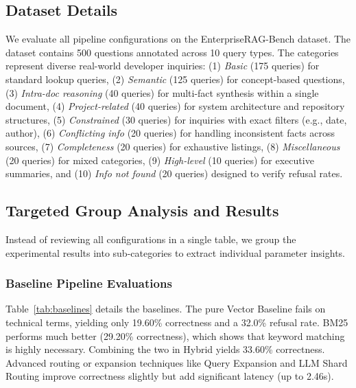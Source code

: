 \documentclass[conference]{IEEEtran}
\begin{document}
\subsection{Dataset Details}
We evaluate all pipeline configurations on the EnterpriseRAG-Bench dataset. The dataset contains 500 questions annotated across 10 query types. The categories represent diverse real-world developer inquiries: (1) \textit{Basic} (175 queries) for standard lookup queries, (2) \textit{Semantic} (125 queries) for concept-based questions, (3) \textit{Intra-doc reasoning} (40 queries) for multi-fact synthesis within a single document, (4) \textit{Project-related} (40 queries) for system architecture and repository structures, (5) \textit{Constrained} (30 queries) for inquiries with exact filters (e.g., date, author), (6) \textit{Conflicting info} (20 queries) for handling inconsistent facts across sources, (7) \textit{Completeness} (20 queries) for exhaustive listings, (8) \textit{Miscellaneous} (20 queries) for mixed categories, (9) \textit{High-level} (10 queries) for executive summaries, and (10) \textit{Info not found} (20 queries) designed to verify refusal rates.

\subsection{Targeted Group Analysis and Results}
Instead of reviewing all configurations in a single table, we group the experimental results into sub-categories to extract individual parameter insights.

\subsubsection{Baseline Pipeline Evaluations}
Table~\ref{tab:baselines} details the baselines. The pure Vector Baseline fails on technical terms, yielding only 19.60\% correctness and a 32.0\% refusal rate. BM25 performs much better (29.20\% correctness), which shows that keyword matching is highly necessary. Combining the two in Hybrid yields 33.60\% correctness. Advanced routing or expansion techniques like Query Expansion and LLM Shard Routing improve correctness slightly but add significant latency (up to 2.46s).
\end{document}
